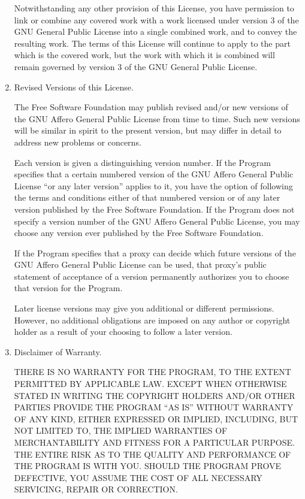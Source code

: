 \documentclass[a4paper,twocolumn]{article}
\begin{document}
\begin{enumerate}
Notwithstanding any other provision of this License, you have permission to
link or combine any covered work with a work licensed under version 3 of
the GNU General Public License into a single combined work, and to convey
the resulting work.  The terms of this License will continue to apply to
the part which is the covered work, but the work with which it is combined
will remain governed by version 3 of the GNU General Public License.

\item Revised Versions of this License.

The Free Software Foundation may publish revised and/or new versions of
the GNU Affero General Public License from time to time.  Such new versions will
be similar in spirit to the present version, but may differ in detail to
address new problems or concerns.

Each version is given a distinguishing version number.  If the
Program specifies that a certain numbered version of the GNU Affero General
Public License ``or any later version'' applies to it, you have the
option of following the terms and conditions either of that numbered
version or of any later version published by the Free Software
Foundation.  If the Program does not specify a version number of the
GNU Affero General Public License, you may choose any version ever published
by the Free Software Foundation.

If the Program specifies that a proxy can decide which future
versions of the GNU Affero General Public License can be used, that proxy's
public statement of acceptance of a version permanently authorizes you
to choose that version for the Program.

Later license versions may give you additional or different
permissions.  However, no additional obligations are imposed on any
author or copyright holder as a result of your choosing to follow a
later version.

\item Disclaimer of Warranty.

\begin{sloppypar}
 THERE IS NO WARRANTY FOR THE PROGRAM, TO THE EXTENT PERMITTED BY
 APPLICABLE LAW.  EXCEPT WHEN OTHERWISE STATED IN WRITING THE
 COPYRIGHT HOLDERS AND/OR OTHER PARTIES PROVIDE THE PROGRAM ``AS IS''
 WITHOUT WARRANTY OF ANY KIND, EITHER EXPRESSED OR IMPLIED,
 INCLUDING, BUT NOT LIMITED TO, THE IMPLIED WARRANTIES OF
 MERCHANTABILITY AND FITNESS FOR A PARTICULAR PURPOSE.  THE ENTIRE
 RISK AS TO THE QUALITY AND PERFORMANCE OF THE PROGRAM IS WITH YOU.
 SHOULD THE PROGRAM PROVE DEFECTIVE, YOU ASSUME THE COST OF ALL
 NECESSARY SERVICING, REPAIR OR CORRECTION.
\end{sloppypar}


\end{enumerate}
\end{document}
